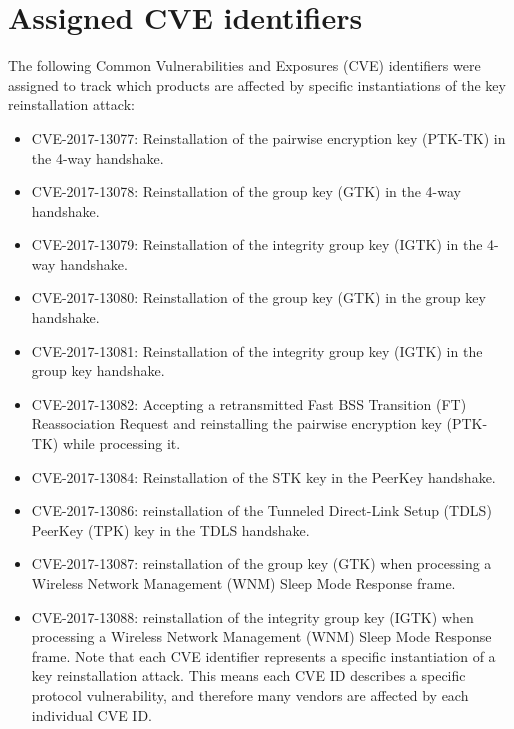 \chapter{Assigned CVE identifiers}
\label{app:cve}
The following Common Vulnerabilities and Exposures (CVE) identifiers were assigned to track which products are affected by specific instantiations of the key reinstallation attack:

\begin{itemize}
\item CVE-2017-13077: Reinstallation of the pairwise encryption key (PTK-TK) in the 4-way handshake.
\item CVE-2017-13078: Reinstallation of the group key (GTK) in the 4-way handshake.
\item CVE-2017-13079: Reinstallation of the integrity group key (IGTK) in the 4-way handshake.
\item CVE-2017-13080: Reinstallation of the group key (GTK) in the group key handshake.
\item CVE-2017-13081: Reinstallation of the integrity group key (IGTK) in the group key handshake.
\item CVE-2017-13082: Accepting a retransmitted Fast BSS Transition (FT) Reassociation Request and reinstalling the pairwise encryption key (PTK-TK) while processing it.
\item CVE-2017-13084: Reinstallation of the STK key in the PeerKey handshake.
\item CVE-2017-13086: reinstallation of the Tunneled Direct-Link Setup (TDLS) PeerKey (TPK) key in the TDLS handshake.
\item CVE-2017-13087: reinstallation of the group key (GTK) when processing a Wireless Network Management (WNM) Sleep Mode Response frame.
\item CVE-2017-13088: reinstallation of the integrity group key (IGTK) when processing a Wireless Network Management (WNM) Sleep Mode Response frame.
Note that each CVE identifier represents a specific instantiation of a key reinstallation attack. This means each CVE ID describes a specific protocol vulnerability, and therefore many vendors are affected by each individual CVE ID.
\end{itemize}